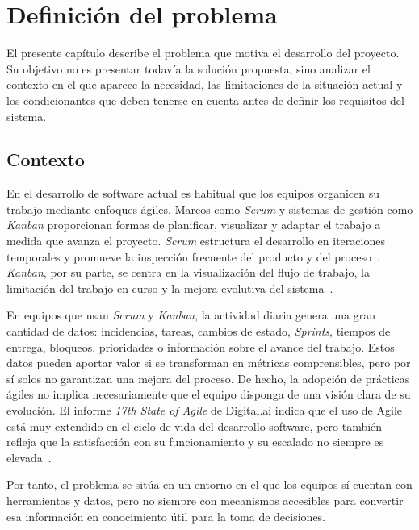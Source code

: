 \chapter{Definición del problema}
\label{defProblema}

El presente capítulo describe el problema que motiva el desarrollo del proyecto. Su objetivo no es presentar todavía la solución propuesta, sino analizar el contexto en el que aparece la necesidad, las limitaciones de la situación actual y los condicionantes que deben tenerse en cuenta antes de definir los requisitos del sistema.

\section{Contexto}

En el desarrollo de software actual es habitual que los equipos organicen su trabajo mediante enfoques ágiles. Marcos como \textit{Scrum} y sistemas de gestión como \textit{Kanban} proporcionan formas de planificar, visualizar y adaptar el trabajo a medida que avanza el proyecto. \textit{Scrum} estructura el desarrollo en iteraciones temporales y promueve la inspección frecuente del producto y del proceso~\cite{ScrumGuide2020}. \textit{Kanban}, por su parte, se centra en la visualización del flujo de trabajo, la limitación del trabajo en curso y la mejora evolutiva del sistema~\cite{Anderson2010Kanban}.

En equipos que usan \textit{Scrum} y \textit{Kanban}, la actividad diaria genera una gran cantidad de datos: incidencias, tareas, cambios de estado, \textit{Sprints}, tiempos de entrega, bloqueos, prioridades o información sobre el avance del trabajo. Estos datos pueden aportar valor si se transforman en métricas comprensibles, pero por sí solos no garantizan una mejora del proceso. De hecho, la adopción de prácticas ágiles no implica necesariamente que el equipo disponga de una visión clara de su evolución. El informe \textit{17th State of Agile} de Digital.ai indica que el uso de Agile está muy extendido en el ciclo de vida del desarrollo software, pero también refleja que la satisfacción con su funcionamiento y su escalado no siempre es elevada~\cite{DigitalAI2024StateOfAgile}.

Por tanto, el problema se sitúa en un entorno en el que los equipos sí cuentan con herramientas y datos, pero no siempre con mecanismos accesibles para convertir esa información en conocimiento útil para la toma de decisiones.

